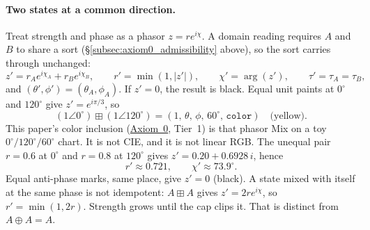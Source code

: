 \documentclass[12pt, a4paper]{article}
\begin{document}
\paragraph{Two states at a common direction.}
Treat strength and phase as a phasor $z=r e^{i\chi}$. A domain reading
requires $A$ and $B$ to share a sort (\S\ref{subsec:axiom0_admissibility}
above), so the sort carries through unchanged:
\begin{equation}
    z' = r_A e^{i\chi_A} + r_B e^{i\chi_B},
    \qquad
    r' = \min(1,|z'|),
    \qquad
    \chi' = \arg(z'),
    \qquad
    \tau' = \tau_A = \tau_B,
    \label{eq:interference_formal}
\end{equation}
and $(\theta',\phi')=(\theta_A,\phi_A)$. If $z'=0$, the result is
black. Equal unit paints at $0^\circ$ and $120^\circ$ give
$z'=e^{i\pi/3}$, so
\[
(1\angle 0^\circ)\boxplus(1\angle 120^\circ)
=(1,\,\theta,\,\phi,\,60^\circ,\,\mathtt{color})
\quad\text{(yellow)}.
\]
This paper's color inclusion
(\hyperref[subsec:axiom0_admissibility]{Axiom~0}, Tier~1) is that phasor Mix
on a toy $0^\circ/120^\circ/60^\circ$ chart. It is not CIE, and it is
not linear RGB.
The unequal pair $r=0.6$ at $0^\circ$ and $r=0.8$ at $120^\circ$
gives $z'=0.20+0.6928\,i$, hence
\[
r'\approx 0.721,\qquad \chi'\approx 73.9^\circ.
\]
Equal anti-phase marks, same place, give $z'=0$ (black).
A state mixed with itself at the same phase is not idempotent:
$A\boxplus A$ gives $z'=2r e^{i\chi}$, so $r'=\min(1,2r)$.
Strength grows until the cap clips it. That is distinct from
$A\oplus A=A$.
\end{document}
